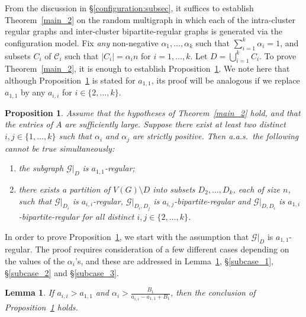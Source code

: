 \documentclass[11pt,reqno]{amsart}
\newtheorem{prop}[theorem]{Proposition}
\newtheorem{lemma}[theorem]{Lemma}
\renewcommand{\theenumi}{\roman{enumi}}
\theoremstyle{definition}
\theoremstyle{remark}
\theoremstyle{conjecture}
\begin{document}
From the discussion in \S\ref{configuration:subsec}, it suffices to establish Theorem~\ref{main_2} on the random multigraph in which each of the intra-cluster regular graphs and inter-cluster bipartite-regular graphs is generated via the configuration model. Fix \emph{any} non-negative $\alpha_{1}, \ldots, \alpha_{k}$ such that $\sum_{i=1}^{k} \alpha_{i} = 1$, and subsets $C_{i}$ of $\mathcal{C}_{i}$ such that $|C_{i}| = \alpha_{i} n$ for $i = 1, \ldots, k$. Let $D = \bigcup_{i=1}^{k} C_{i}$. To prove Theorem~\ref{main_2}, it is enough to establish Proposition~\ref{C_not_cluster}. We note here that although   Proposition~\ref{C_not_cluster} is stated for $a_{1,1}$, its proof will be analogous if we replace $a_{1,1}$ by any $a_{i,i}$ for $i \in \{2, \ldots, k\}$.

\begin{prop}\label{C_not_cluster}
Assume that the hypotheses of Theorem~\ref{main_2} hold, and that the entries of $A$ are sufficiently large. Suppose there exist at least two distinct $i, j \in \{1, \ldots, k\}$ such that $\alpha_{i}$ and $\alpha_{j}$ are strictly positive. Then a.a.s.\ the following cannot be true simultaneously:
\renewcommand{\theenumi}{\roman{enumi}}
\begin{enumerate}
\item the subgraph $\mathcal{G}|_{D}$ is $a_{1,1}$-regular;
\item there exists a partition of $V(G) \setminus D$ into subsets $D_{2}, \ldots, D_{k}$, each of size $n$, such that $\mathcal{G}|_{D_{i}}$ is $a_{i,i}$-regular, $\mathcal{G}|_{D_{i}, D_{j}}$ is $a_{i,j}$-bipartite-regular and $\mathcal{G}|_{D, D_{i}}$ is $a_{1,i}$-bipartite-regular for all distinct $i, j \in \{2, \ldots, k\}$.
\end{enumerate}
\end{prop}

In order to prove Proposition~\ref{C_not_cluster}, we start with the assumption that $\mathcal{G}|_{D}$ is $a_{1,1}$-regular. The proof requires consideration of a few different cases depending on the values of the $\alpha_{i}$'s, and these are addressed in Lemma~\ref{simpler}, \S\ref{subcase_1}, \S\ref{subcase_2} and \S\ref{subcase_3}.


\begin{lemma}\label{simpler}
If $a_{i,i} > a_{1,1}$ and $\alpha_{i} > \frac{B_{1}}{a_{i,i} - a_{1,1} + B_{1}}$, then the conclusion of Proposition~\ref{C_not_cluster} holds.
\end{lemma}   
\end{document}
